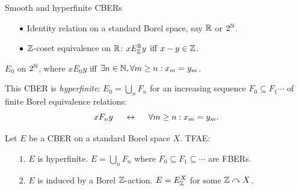 \documentclass{beamer}
\begin{document}
    \begin{frame}{Smooth and hyperfinite CBERs}
        \vspace{-0.1in}
        \begin{example}[Smooth]
            \begin{itemize}
                \item[\scriptsize$\bullet$] Identity relation on a standard Borel space, say $\mathbb{R}$ or $2^{\mathbb{N}}$.
                    \pause
                \item[\scriptsize$\bullet$] $\mathbb{Z}$-coset equivalence on $\mathbb{R}$: $xE^{\mathbb{R}}_{\mathbb{Z}} y$ iff $x-y\in\mathbb{Z}$.
            \end{itemize}
        \end{example}

        \pause
        \vspace{-0.1in}

        \begin{example}[Hyperfinite]
            $E_0$ on $2^{\mathbb{N}}$, where $xE_0y$ iff $\exists n\in\mathbb{N},\forall m\geq n:x_m=y_m$.
        \end{example}

        \pause

        This CBER is \textit{hyperfinite}: $E_0=\bigcup_nF_n$ for an increasing sequence $F_0\subseteq F_1\cdots$ of finite Borel equivalence relations:
        \pause
        \vspace{-0.1in}
        \begin{equation*}
            xF_ny\ \ \ \ \leftrightarrow\ \ \ \ \forall m\geq n:x_m=y_m.
        \end{equation*}

        \pause
        \vspace{-0.15in}

        \begin{theorem}
            Let $E$ be a CBER on a standard Borel space $X$. TFAE:
            \begin{itemize}
                \item[$1.$] $E$ is hyperfinite. {\color{gray}\footnotesize $E=\bigcup_nF_n$ where $F_0\subseteq F_1\subseteq\cdots$ are FBERs.}
                \item[$2.$] $E$ is induced by a Borel $\mathbb{Z}$-action. {\color{gray}\footnotesize $E=E_{\mathbb{Z}}^X$ for some $\mathbb{Z}\curvearrowright X$.}
            \end{itemize}
        \end{theorem}
    \end{frame}
\end{document}
